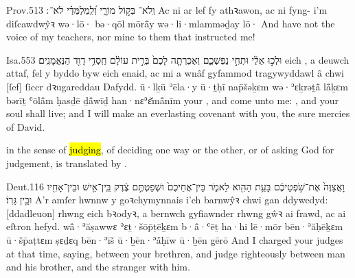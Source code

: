 \begin{example}{Prov.}{5}{13}{}{}
	\quoling
	{וְֽלֹא־ בְּק֣וֹל מוֹרָ֑י וְ֝לִֽמְלַמְּדַ֗י לֹא־ ׃}
	{Ac ni  ar lef fy athꝛawon, ac ni  fyng- i’m diſcawdwŷꝛ}
	{wə·lō· bə·qōl mōrå̄y wə·li·mlamməḏay lō· }
	{And have not  the voice of my teachers, nor  mine  to them that instructed me!}
\end{example}

\begin{example}{Isa.}{55}{3}{}{}
	\quoling
	{  וּלְכ֣וּ אֵלַ֔י  וּתְחִ֣י נַפְשְׁכֶ֑ם וְאֶכְרְתָ֤ה לָכֶם֙ בְּרִ֣ית עוֹלָ֔ם חַֽסְדֵ֥י דָוִ֖ד הַנֶּאֱמָנִֽים׃}
	{ eich , a deuwch attaf,  fel y byddo byw eich enaid, ac mi a wnâf gyfammod tragywyddawl â chwi [ſef] ſiccr dꝛugareddau Dafydd.}
	{  ū·lḵū ʾēla·y  ū·ṯḥī nap̄šəḵɛm wə·ʾɛḵrəṯå̄ lå̄ḵɛm bərīṯ ʿōlå̄m ḥasḏē ḏå̄wīḏ han·nɛʾɛ̆må̄nīm}
	{ your , and come unto me: , and your soul shall live; and I will make an everlasting covenant with you,  the sure mercies of David.}
\end{example}




\begin{paper}
	{\click}  in the sense of \hl{judging}, of deciding one way or the other, or of asking God for judgement, is translated by .
\end{paper}

\begin{example}{Deut.}{1}{16}{}{}
	\quoling
	{וָאֲצַוֶּה֙ אֶת־שֹׁ֣פְטֵיכֶ֔ם בָּעֵ֥ת הַהִ֖וא לֵאמֹ֑ר  בֵּין־אֲחֵיכֶם֙ וּשְׁפַטְתֶּ֣ם צֶ֔דֶק בֵּֽין־אִ֥ישׁ וּבֵין־אָחִ֖יו וּבֵ֥ין גֵּרֽוֹ׃}
	{A’r amſer hwnnw y goꝛchymynnais i’ch barnwŷꝛ chwi gan ddywedyd:  [ddadleuon] rhwng eich bꝛodyꝛ, a bernwch gyfiawnder rhwng gŵꝛ ai frawd, ac ai eſtron hefyd.}
	{wå̄·ʾăṣawwɛ ʾɛṯ·šōp̄ṭēḵɛm b·å̄·ʿēṯ ha·hi lē·mōr  bēn·ʾăḥēḵɛm ū·šp̄aṭtɛm ṣɛḏɛq bēn·ʾīš ū·ḇēn·ʾå̄ḥīw ū·ḇēn gērō}
	{And I charged your judges at that time, saying,   between your brethren, and judge righteously between  man and his brother, and the stranger  with him.}
\end{example}



